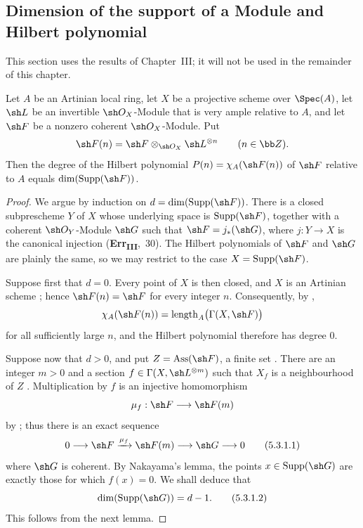 \subsection{Dimension of the support of a Module and Hilbert polynomial}
\label{subsection:IV.5.3}


This section uses the results of Chapter~III; it will not be used in
the remainder of this chapter.

\begin{proposition}[5.3.1]
\label{IV.5.3.1}
Let $A$ be an Artinian local ring, let $X$ be a projective scheme over
$\Spec(A)$, let $\sh L$ be an invertible $\sh O_X$-Module that is very
ample relative to $A$, and let $\sh F$ be a nonzero coherent
$\sh O_X$-Module. Put
\[
\sh F(n)=\sh F\otimes_{\sh O_X}\sh L^{\otimes n}
\qquad(n\in\bb Z).
\]
Then the degree of the Hilbert polynomial $P(n)=\chi_A(\sh F(n))$
of $\sh F$ relative to $A$  equals
$\dim(\operatorname{Supp}(\sh F))$.
\end{proposition}

\begin{proof}
We argue by induction on $d=\dim(\operatorname{Supp}(\sh F))$.
There is a closed subprescheme $Y$ of $X$ whose underlying space is
$\operatorname{Supp}(\sh F)$, together with a coherent
$\sh O_Y$-Module $\sh G$ such that $\sh F=j_*(\sh G)$, where
$j:Y\to X$ is the canonical injection
(\textbf{Err}\textsubscript{\textbf{III}},~30).
The Hilbert polynomials of $\sh F$ and $\sh G$ are plainly the same,
so we may restrict to the case
$X=\operatorname{Supp}(\sh F)$.

Suppose first that $d=0$.
Every point of $X$ is then closed, and $X$ is an Artinian scheme
; hence $\sh F(n)=\sh F$ for every integer $n$.
Consequently, by ,
\[
\chi_A(\sh F(n))
  =\operatorname{length}_A\bigl(\Gamma(X,\sh F)\bigr)
\]
for all sufficiently large $n$, and the Hilbert polynomial therefore
has degree $0$.

Suppose now that $d>0$, and put
$Z=\operatorname{Ass}(\sh F)$, a finite set .
There are an integer $m>0$ and a section
$f\in\Gamma(X,\sh L^{\otimes m})$ such that $X_f$ is a neighbourhood
of $Z$ .
Multiplication by $f$ is an injective homomorphism
\[
\mu_f:\sh F\longrightarrow\sh F(m)
\]
by ; thus there is an exact sequence
\begin{equation}
0\longrightarrow\sh F
 \xrightarrow{\mu_f}\sh F(m)
 \longrightarrow\sh G
 \longrightarrow0
\tag{5.3.1.1}\label{IV.5.3.1.1}
\end{equation}
where $\sh G$ is coherent.
By Nakayama's lemma, the points
$x\in\operatorname{Supp}(\sh G)$ are exactly those for which
$f(x)=0$.
We shall deduce that
\begin{equation}
\dim(\operatorname{Supp}(\sh G))=d-1.
\tag{5.3.1.2}\label{IV.5.3.1.2}
\end{equation}
This follows from the next lemma.
\end{proof}

